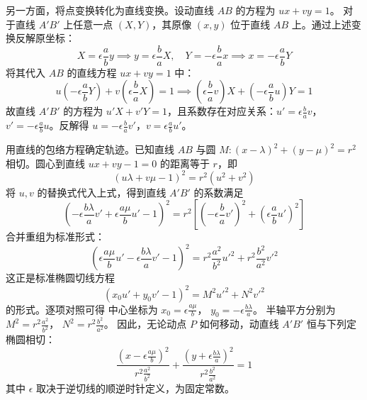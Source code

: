 \begin{solution}
另一方面，将点变换转化为直线变换。设动直线 $AB$ 的方程为 $ux + vy = 1$。
对于直线 $A'B'$ 上任意一点 $(X,Y)$，其原像 $(x,y)$ 位于直线 $AB$ 上。通过上述变换反解原坐标：
$$ X = \epsilon \frac{a}{b} y \implies y = \epsilon \frac{b}{a} X, \quad Y = -\epsilon \frac{b}{a} x \implies x = -\epsilon \frac{a}{b} Y $$
将其代入 $AB$ 的直线方程 $ux + vy = 1$ 中：
$$ u \left(-\epsilon \frac{a}{b} Y\right) + v \left(\epsilon \frac{b}{a} X\right) = 1 \implies \left(\epsilon \frac{b}{a} v\right) X + \left(-\epsilon \frac{a}{b} u\right) Y = 1 $$
故直线 $A'B'$ 的方程为 $u'X + v'Y = 1$，且系数存在对应关系：$u' = \epsilon \frac{b}{a} v$，$v' = -\epsilon \frac{a}{b} u$。反解得 $u = -\epsilon \frac{b}{a} v'$，$v = \epsilon \frac{a}{b} u'$。

用直线的包络方程确定轨迹。已知直线 $AB$ 与圆 $M: (x-\lambda)^2 + (y-\mu)^2 = r^2$ 相切。圆心到直线 $ux + vy - 1 = 0$ 的距离等于 $r$，即
$$ (u\lambda + v\mu - 1)^2 = r^2(u^2 + v^2) $$
将 $u, v$ 的替换式代入上式，得到直线 $A'B'$ 的系数满足
$$ \left( -\epsilon \frac{b\lambda}{a} v' + \epsilon \frac{a\mu}{b} u' - 1 \right)^2 = r^2 \left[ \left(-\epsilon \frac{b}{a} v'\right)^2 + \left(\epsilon \frac{a}{b} u'\right)^2 \right] $$
合并重组为标准形式：
$$ \left( \epsilon \frac{a\mu}{b} u' - \epsilon \frac{b\lambda}{a} v' - 1 \right)^2 = r^2 \frac{a^2}{b^2} u'^2 + r^2 \frac{b^2}{a^2} v'^2 $$
这正是标准椭圆切线方程
$$ (x_0 u' + y_0 v' - 1)^2 = M^2 u'^2 + N^2 v'^2 $$
\noindent 的形式。逐项对照可得
中心坐标为 $x_0 = \epsilon \frac{a\mu}{b}$， $y_0 = -\epsilon \frac{b\lambda}{a}$。
半轴平方分别为 $M^2 = r^2 \frac{a^2}{b^2}$， $N^2 = r^2 \frac{b^2}{a^2}$。
因此，无论动点 $P$ 如何移动，动直线 $A'B'$ 恒与下列定椭圆相切：
$$ \frac{\left(x - \epsilon \frac{a\mu}{b}\right)^2}{r^2 \frac{a^2}{b^2}} + \frac{\left(y + \epsilon \frac{b\lambda}{a}\right)^2}{r^2 \frac{b^2}{a^2}} = 1 $$
其中 $\epsilon$ 取决于逆切线的顺逆时针定义，为固定常数。
\end{solution}

